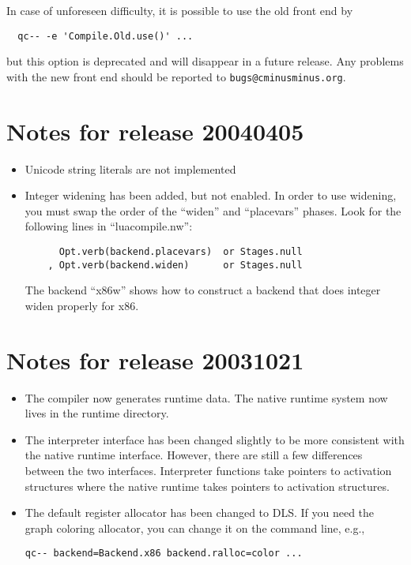 \documentclass{article}
\begin{document}
In case of unforeseen difficulty, it is possible to use the old front
end by
\begin{verbatim}
  qc-- -e 'Compile.Old.use()' ...
\end{verbatim}
but this option is deprecated and will disappear in a future release.
Any problems with the new front end should be reported to
\texttt{bugs@cminusminus.org}. 


\section{Notes for release 20040405}
\begin{itemize}
\item
Unicode string literals are not implemented

\item Integer widening has been added, but not enabled.
In order to use widening, you must swap the order of the
``widen'' and ``placevars'' phases.  Look for the following lines in
``luacompile.nw'':
\begin{verbatim}
      Opt.verb(backend.placevars)  or Stages.null
    , Opt.verb(backend.widen)      or Stages.null
\end{verbatim}
The backend ``x86w'' shows how to construct a backend that does
integer widen properly for x86.

\end{itemize}



\section{Notes for release 20031021}
\begin{itemize}
\item
The compiler now generates runtime data. The native runtime system now
lives in the runtime directory.
\item
The interpreter interface has been changed slightly to be more
consistent with the native runtime interface. However, there are still
a few differences between the two interfaces. Interpreter functions
take pointers to activation structures where the native runtime takes
pointers to activation structures.
\item
The default register allocator has been changed to DLS. If you need
the graph coloring allocator, you can change it on the command line,
e.g.,
\begin{verbatim}
qc-- backend=Backend.x86 backend.ralloc=color ...
\end{verbatim}


\end{itemize}
\end{document}
